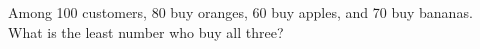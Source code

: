 Among 100 customers, 80 buy oranges, 60 buy apples, and 70 buy bananas. What is the least number who buy all three?
